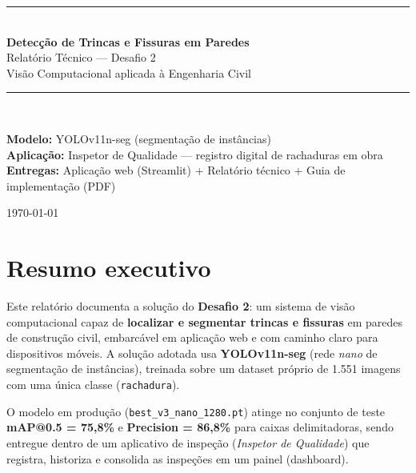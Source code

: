 \documentclass[11pt,a4paper]{article}
\begin{document}
\begin{titlepage}
\centering
\vspace*{1.5cm}
{\color{primary}\rule{\linewidth}{1.5pt}}\\[0.6cm]
{\Huge\bfseries\color{primary} Detecção de Trincas e Fissuras em Paredes}\\[0.35cm]
{\LARGE\color{accent} Relatório Técnico — Desafio 2}\\[0.25cm]
{\large\color{graytxt} Visão Computacional aplicada à Engenharia Civil}\\[0.4cm]
{\color{primary}\rule{\linewidth}{1.5pt}}\\[1.2cm]

\begin{infobox}
\centering
\textbf{Modelo:} YOLOv11n-seg (segmentação de instâncias) \\[2pt]
\textbf{Aplicação:} Inspetor de Qualidade — registro digital de rachaduras em obra \\[2pt]
\textbf{Entregas:} Aplicação web (Streamlit) + Relatório técnico + Guia de implementação (PDF)
\end{infobox}

\vfill
{\color{graytxt} \today}
\end{titlepage}

\tableofcontents
\newpage

\section{Resumo executivo}
Este relatório documenta a solução do \textbf{Desafio 2}: um sistema de visão
computacional capaz de \textbf{localizar e segmentar trincas e fissuras} em paredes de
construção civil, embarcável em aplicação web e com caminho claro para dispositivos móveis.
A solução adotada usa \textbf{YOLOv11n-seg} (rede \emph{nano} de segmentação de instâncias),
treinada sobre um dataset próprio de 1.551 imagens com uma única classe (\texttt{rachadura}).

O modelo em produção (\texttt{best\_v3\_nano\_1280.pt}) atinge no conjunto de teste
\textbf{mAP@0.5 = 75,8\%} e \textbf{Precision = 86,8\%} para caixas delimitadoras, sendo
entregue dentro de um aplicativo de inspeção (\emph{Inspetor de Qualidade}) que registra,
historiza e consolida as inspeções em um painel (dashboard).
\end{document}
